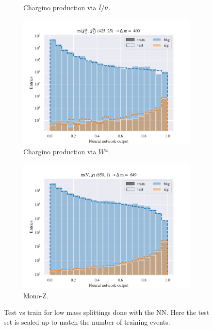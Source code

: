 \begin{figure}[H]
\begin{subfigure}[t!]{0.49\textwidth}
        \caption{Chargino production via $\Tilde{l}/\Tilde{\nu}$.}
        \label{fig:SlepsnuNNLow}
    \end{subfigure}      
    \begin{subfigure}[t!]{0.49\textwidth}
        \includegraphics[width = \textwidth]{Figures/WW/NN/All_level/High/scaled_train_test_395330.pdf}
        \caption{Chargino production via $W^\pm$.}
        \label{fig:WWNNLow}
    \end{subfigure}
    \begin{subfigure}[t!]{0.49\textwidth}
        \includegraphics[width = \textwidth]{Figures/Mono_Z/ML/NN/All_level/High/scaled_train_test_310617.pdf}
        \caption{Mono-Z.}
        \label{fig:MonoZNNLow}
    \end{subfigure}
    \caption{Test vs train for low mass splittings done with the NN. Here the test set is scaled up to match the number of training events.}
    \label{fig:AllLowNN}
\end{figure}



















